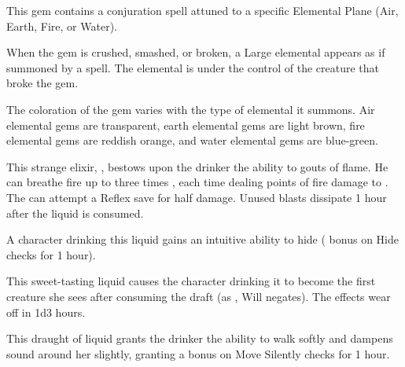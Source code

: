 {\begin{comment}
Strong conjuration; CL 14th; Craft Wondrous Item, summon monster VII; Price 145,000 gp;Weight 1 lb.
\end{comment}

 This gem contains a conjuration spell attuned to a specific Elemental Plane (Air, Earth, Fire, or Water).

When the gem is crushed, smashed, or broken, a Large elemental appears as if summoned by a  spell. The elemental is under the control of the creature that broke the gem.

The coloration of the gem varies with the type of elemental it summons. Air elemental gems are transparent, earth elemental gems are light brown, fire elemental gems are reddish orange, and water elemental gems are blue-green.


 This strange elixir, , bestows upon the drinker the ability to  gouts of flame. He can breathe fire up to three times , each time dealing  points of fire damage to . The  can attempt a Reflex save for half damage. Unused blasts dissipate 1 hour after the liquid is consumed.


 A character drinking this liquid gains an intuitive ability to hide (  bonus on Hide checks for 1 hour).


 This sweet-tasting liquid causes the character drinking it to become  the first creature she sees after consuming the draft (as , Will negates). The effects wear off in 1d3 hours.


 This draught of liquid grants the drinker the ability to walk softly and dampens sound around her slightly, granting a   bonus on Move Silently checks for 1 hour.

}
